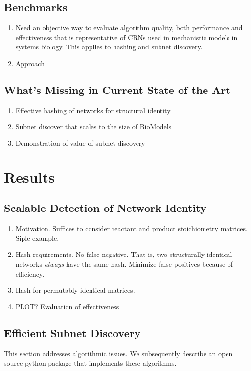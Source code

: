 \documentclass{article}
\begin{document}
\subsection{Benchmarks}
\begin{enumerate}
    \item Need an objective way to evaluate algorithm quality, both performance and effectiveness that is representative of CRNs used in mechanistic models in systems biology. This applies to hashing and subnet discovery.
    \item Approach
\end{enumerate}

\subsection{What's Missing in Current State of the Art}
\begin{enumerate}
    \item Effective hashing of networks for structural identity
    \item Subnet discover that scales to the size of BioModels
    \item Demonstration of value of subnet discovery
\end{enumerate}

\section{Results}


\subsection{Scalable Detection of Network Identity}
\begin{enumerate}
    \item Motivation. Suffices to consider reactant and product stoichiometry matrices. Siple example.
    \item Hash requirements. No false negative. That is, two structurally identical networks {\em always} have the same hash. Minimize false positives because of efficiency.
    \item Hash for permutably identical matrices.
    \item PLOT? Evaluation of effectiveness
\end{enumerate}

\subsection{Efficient Subnet Discovery}
This section addresses algorithmic issues. We subsequently describe an open source python package that implements these algorithms.
\end{document}
